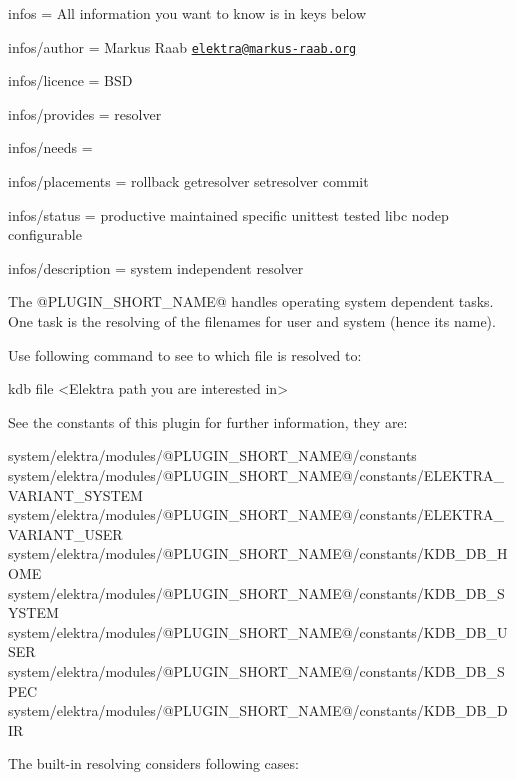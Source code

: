 
\begin{DoxyItemize}
\item infos = All information you want to know is in keys below
\item infos/author = Markus Raab \href{mailto:elektra@markus-raab.org}{\tt elektra@markus-\/raab.\+org}
\item infos/licence = B\+SD
\item infos/provides = resolver
\item infos/needs =
\item infos/placements = rollback getresolver setresolver commit
\item infos/status = productive maintained specific unittest tested libc nodep configurable
\item infos/description = system independent resolver
\end{DoxyItemize}

The {\ttfamily @P\+L\+U\+G\+I\+N\+\_\+\+S\+H\+O\+R\+T\+\_\+\+N\+A\+ME@} handles operating system dependent tasks. One task is the resolving of the filenames for user and system (hence its name).

Use following command to see to which file is resolved to\+:


\begin{DoxyCode}
kdb file <Elektra path you are interested in>
\end{DoxyCode}


See the constants of this plugin for further information, they are\+:


\begin{DoxyCode}
system/elektra/modules/@PLUGIN\_SHORT\_NAME@/constants
system/elektra/modules/@PLUGIN\_SHORT\_NAME@/constants/ELEKTRA\_VARIANT\_SYSTEM
system/elektra/modules/@PLUGIN\_SHORT\_NAME@/constants/ELEKTRA\_VARIANT\_USER
system/elektra/modules/@PLUGIN\_SHORT\_NAME@/constants/KDB\_DB\_HOME
system/elektra/modules/@PLUGIN\_SHORT\_NAME@/constants/KDB\_DB\_SYSTEM
system/elektra/modules/@PLUGIN\_SHORT\_NAME@/constants/KDB\_DB\_USER
system/elektra/modules/@PLUGIN\_SHORT\_NAME@/constants/KDB\_DB\_SPEC
system/elektra/modules/@PLUGIN\_SHORT\_NAME@/constants/KDB\_DB\_DIR
\end{DoxyCode}


The built-\/in resolving considers following cases\+:


